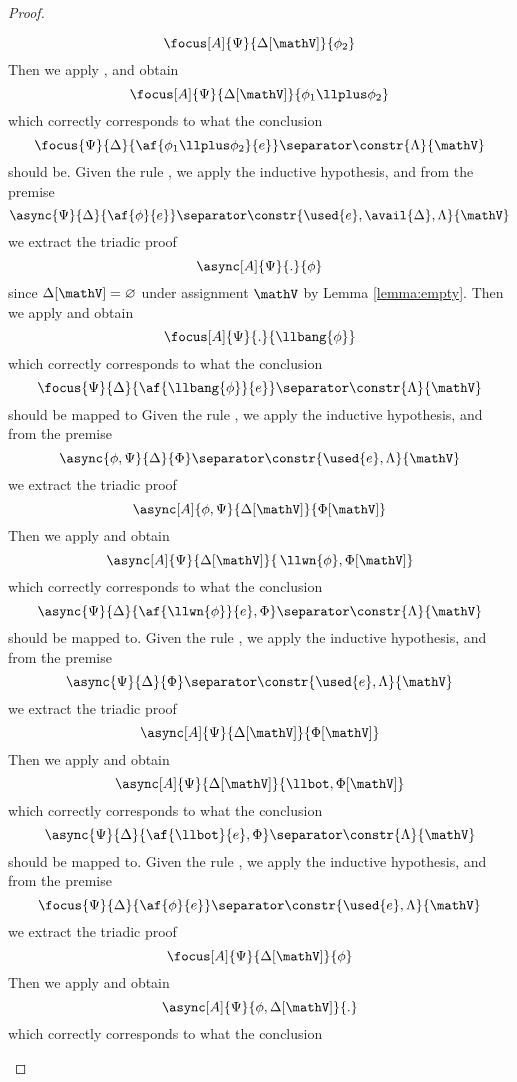 \begin{proof}
\begin{itemize}
			$$ \focus[A]{\Psi}{\Delta[\mathV]}{\phi_2} $$
			Then we apply \derRule[A]{\displayplus[R]}, and obtain
			$$ \focus[A]{\Psi}{\Delta[\mathV]}{\phi_1 \llplus \phi_2} $$
			which correctly corresponds to what the conclusion
			$$ \focus{\Psi}{\Delta}{\af{\phi_1 \llplus \phi_2}{e}} \separator \constr{\Lambda}{\mathV} $$
			should be.
		\indCase{\displaybang} Given the rule \derRule{\displaybang}, we apply the inductive hypothesis, and from the premise
			$$ \async{\Psi}{\Delta}{\af{\phi}{e}} \separator \constr{\used{e}, \avail{\Delta}, \Lambda}{\mathV} $$
			we extract the triadic proof
			$$ \async[A]{\Psi}{.}{\phi} $$
			since $\Delta[\mathV] = \varnothing$ under assignment $\mathV$ by Lemma \ref{lemma:empty}.
			Then we apply \derRule[A]{\displaybang} and obtain
			$$ \focus[A]{\Psi}{.}{\llbang{\phi}} $$
			which correctly corresponds to what the conclusion 
			$$ \focus{\Psi}{\Delta}{\af{\llbang{\phi}}{e}} \separator \constr{\Lambda}{\mathV} $$
			should be mapped to
		\indCase{\displaywn} Given the rule \derRule{\displaywn}, we apply the inductive hypothesis, and from the premise
			$$ \async{\phi, \Psi}{\Delta}{\Phi} \separator \constr{\used{e}, \Lambda}{\mathV} $$
			we extract the triadic proof
			$$ \async[A]{\phi, \Psi}{\Delta[\mathV]}{\Phi[\mathV]}$$
			Then we apply \derRule[A]{\displaywn} and obtain
			$$ \async[A]{\Psi}{\Delta[\mathV]}{\,\llwn{\phi}, \Phi[\mathV]} $$
			which correctly corresponds to what the conclusion
			$$ \async{\Psi}{\Delta}{\af{\llwn{\phi}}{e}, \Phi} \separator \constr{\Lambda}{\mathV} $$
			should be mapped to.
		\indCase{\displaybot} Given the rule \derRule{\displaybot}, we apply the inductive hypothesis, and from the premise
			$$ \async{\Psi}{\Delta}{\Phi} \separator \constr{\used{e}, \Lambda}{\mathV} $$
			we extract the triadic proof
			$$ \async[A]{\Psi}{\Delta[\mathV]}{\Phi[\mathV]} $$
			Then we apply \derRule[A]{\displaybot} and obtain
			$$ \async[A]{\Psi}{\Delta[\mathV]}{\llbot, \Phi[\mathV]} $$
			which correctly corresponds to what the conclusion
			$$ \async{\Psi}{\Delta}{\af{\llbot}{e}, \Phi} \separator \constr{\Lambda}{\mathV} $$
			should be mapped to.
		\indCase{\displaydecide[1]} Given the rule \derRule{\displaydecide[1]}, we apply the inductive hypothesis, and from the premise
			$$ \focus{\Psi}{\Delta}{\af{\phi}{e}} \separator \constr{\used{e}, \Lambda}{\mathV} $$
			we extract the triadic proof
			$$ \focus[A]{\Psi}{\Delta[\mathV]}{\phi} $$
			Then we apply \derRule[A]{\displaydecide[1]} and obtain
			$$ \async[A]{\Psi}{\phi, \Delta[\mathV]}{.} $$
			which correctly corresponds to what the conclusion

\end{itemize}
\end{proof}
